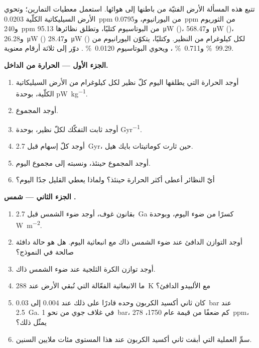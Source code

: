 \begin{problem}\label{pb:b2:precambrian-earth:1}
تتبع هذه المسألة الأرض الفتيّة من باطنها إلى هوائها. استعمل معطيات
التمارين؛ وتحوي الأرض السيليكاتية الكلّية \qty{0.0203}{ppm} من اليورانيوم، و\qty{0.0795}{ppm} من
الثوريوم و\qty{240}{ppm} من البوتاسيوم كتليًا، وتطلق نظائرها \qty{95.13}{\micro W}
()، و\qty{568.47}{\micro W} ()، و\qty{26.28}{\micro W} ()
و\qty{28.47}{\micro W} () لكل كيلوغرام من النظير. وكتليًا، يتكوّن اليورانيوم من
\qty{99.29}{\percent}  و\qty{0.711}{\percent} ، ويحوي البوتاسيوم
\qty{0.0120}{\percent} . دوّر إلى ثلاثة أرقام معنوية.

\noindent\textbf{الجزء الأول --- الحرارة من الداخل.}
\begin{enumerate}
  \item أوجد الحرارة التي يطلقها اليوم كلّ نظير لكل كيلوغرام من الأرض السيليكاتية الكلّية، بوحدة
        \unit{pW.kg^{-1}}.
  \item أوجد المجموع.
  \item أوجد ثابت التفكّك لكلّ نظير، بوحدة \unit{Gyr^{-1}}.
  \item أوجد كلّ إسهام قبل \qty{2.7}{Gyr}، حين ثارت كوماتيتات بايك هيل.
  \item أوجد المجموع حينئذ، ونسبته إلى مجموع اليوم.
  \item أيّ النظائر أعطى أكثر الحرارة حينئذ؟ ولماذا يعطي القليل جدًا اليوم؟
\end{enumerate}

\noindent\textbf{الجزء الثاني --- شمس .}
\begin{enumerate}[resume]
  \item بقانون غوف، أوجد ضوء الشمس قبل \qty{2.7}{Ga} كسرًا من ضوء اليوم،
        وبوحدة \unit{W.m^{-2}}.
  \item أوجد التوازن الدافئ عند ضوء الشمس ذاك مع انبعاثية اليوم. هل هو حالة دافئة صالحة
        في النموذج؟
  \item أوجد توازن الكرة الثلجية عند ضوء الشمس ذاك.
  \item ما الانبعاثية الفعّالة التي تُبقي الأرض عند \qty{288}{K} مع الألبيدو الدافئ؟
  \item كان ثاني أكسيد الكربون وحده قادرًا على ذلك عند 0.004 إلى \qty{0.03}{bar} عند \qty{2.5}{Ga}.
        في غلاف جوي من نحو \qty{1}{bar}، كم ضعفًا من قيمة عام 1750، \qty{278}{ppm}، يمثّل
        ذلك؟
  \item سمِّ العملية التي أبقت ثاني أكسيد الكربون عند هذا المستوى مئات ملايين
        السنين.
\end{enumerate}


\end{problem}
